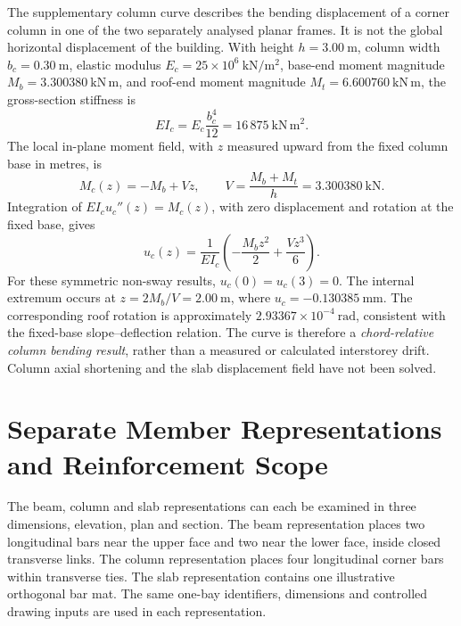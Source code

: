 The supplementary column curve describes the bending displacement of a
corner column in one of the two separately analysed planar frames. It is
not the global horizontal displacement of the building. With height
\(h=3.00~\mathrm{m}\), column width \(b_c=0.30~\mathrm{m}\), elastic modulus
\(E_c=25\times10^6~\mathrm{kN/m^2}\), base-end moment magnitude
\(M_b=3.300380~\mathrm{kN\,m}\), and roof-end moment magnitude
\(M_t=6.600760~\mathrm{kN\,m}\), the gross-section stiffness is
\begin{equation}
EI_c=E_c\frac{b_c^4}{12}=16\,875~\mathrm{kN\,m^2}.
\end{equation}
The local in-plane moment field, with \(z\) measured upward from the fixed
column base in metres, is
\begin{equation}
M_c(z)=-M_b+Vz,\qquad
V=\frac{M_b+M_t}{h}=3.300380~\mathrm{kN}.
\end{equation}
Integration of \(EI_c u_c''(z)=M_c(z)\), with zero displacement and rotation
at the fixed base, gives
\begin{equation}
u_c(z)=\frac{1}{EI_c}
\left(-\frac{M_b z^2}{2}+\frac{Vz^3}{6}\right).
\end{equation}
For these symmetric non-sway results, \(u_c(0)=u_c(3)=0\).
The internal extremum occurs at \(z=2M_b/V=2.00~\mathrm{m}\),
where \(u_c=-0.130385~\mathrm{mm}\). The corresponding roof rotation is
approximately \(2.93367\times10^{-4}~\mathrm{rad}\), consistent with
the fixed-base slope--deflection relation. The curve is therefore a
\emph{chord-relative column bending result}, rather than a measured or
calculated interstorey drift. Column axial shortening and the slab
displacement field have not been solved.

\section{Separate Member Representations and Reinforcement Scope}
\label{sec:onebay_member_details}

The beam, column and slab representations can each be examined in
three dimensions, elevation, plan and section. The beam representation
places two longitudinal bars near the upper face and two near the lower face,
inside closed transverse links. The column representation places four
longitudinal corner bars within transverse ties. The slab representation
contains one illustrative orthogonal bar mat. The same one-bay identifiers,
dimensions and controlled drawing inputs are used in each representation.

